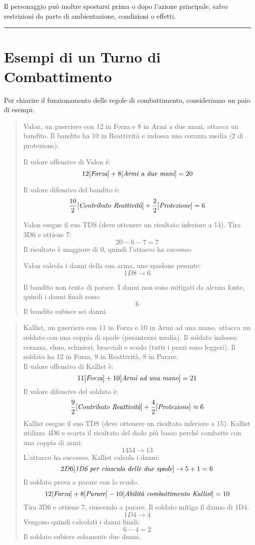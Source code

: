 \documentclass[../manuale_main.tex]{subfiles}
\begin{document}
Il personaggio può inoltre spostarsi prima o dopo l’azione principale, salvo restrizioni da parte di ambientazione, condizioni o effetti.


\vspace{0.5cm}
\noindent
\begin{center}
\rule{\textwidth}{0.4pt} 
\end{center}
\vspace{0.5cm}

\section*{Esempi di un Turno di Combattimento}
Per chiarire il funzionamento delle regole di combattimento, consideriamo un paio di esempi:

\begin{quote}
Valon, un guerriero con 12 in Forza e 8 in Armi a due mani, attacca un bandito. Il bandito ha 10 in Reattività e indossa una corazza media (2 di protezione).

Il valore offensivo di Valon è:
\[
12 [\emph{Forza}] + 8 [\emph{Armi a due mani}] = 20
\]

Il valore difensivo del bandito è:
\[
\frac{10}{2} [\emph{Contributo Reattività}] + \frac{2}{2} [\emph{Protezione}] = 6
\]

Valon esegue il suo TDS (deve ottenere un risultato inferiore a 14). Tira 3D6 e ottiene 7:
\[
20 - 6 - 7 = 7
\]
Il risultato è maggiore di 0, quindi l’attacco ha successo.

Valon calcola i danni della sua arma, uno spadone pesante:
\[
1D8 \rightarrow 6
\]

Il bandito non tenta di parare. I danni non sono mitigati da alcuna fonte, quindi i danni finali sono:
\[
6
\]
Il bandito subisce sei danni.
\end{quote}


\begin{quote}
Kallist, un guerriero con 11 in Forza e 10 in Armi ad una mano, attacca un soldato con una coppia di spade (pesantezza media). Il soldato indossa: corazza, elmo, schinieri, bracciali e scudo (tutti i pezzi sono leggeri). Il soldato ha 12 in Forza, 9 in Reattività, 8 in Parare.\\
Il valore offensivo di Kallist è:
\[
11 [\emph{Forza}] + 10 [\emph{Armi ad una mano}] = 21
\]
 Il valore difensivo del soldato è:
\[
\frac{9}{2} [\emph{Contributo Reattività}] + \frac{4}{2} [\emph{Protezione}] \approx 6
\]
Kallist esegue il suo TDS (deve ottenere un risultato inferiore a 15). Kallist utilizza 4D6 e scarta il risultato del dado più basso perché combatte con una coppia di armi:
\[
1 4 5 4 \rightarrow 13 
\]
L'attacco ha successo. Kallist calcola i danni:\\
\[
2D6 [\emph{1D6 per ciascula delle due spade}] \rightarrow 5 + 1 = 6
\]
Il soldato prova a parare con lo scudo.
\[
12 [\emph{Forza}] + 8 [\emph{Parare}] - 10 [\emph{Abilità combattimento Kallist}] = 10
\]
Tira 3D6 e ottiene 7, riuscendo a parare. Il soldato mitiga il danno di 1D4.\\
\[
1D4 \rightarrow 4
\]
Vengono quindi calcolati i danni finali:
\[
6 - 4 = 2
\]
Il soldato subisce solamente due danni.
\end{quote}
\end{document}
